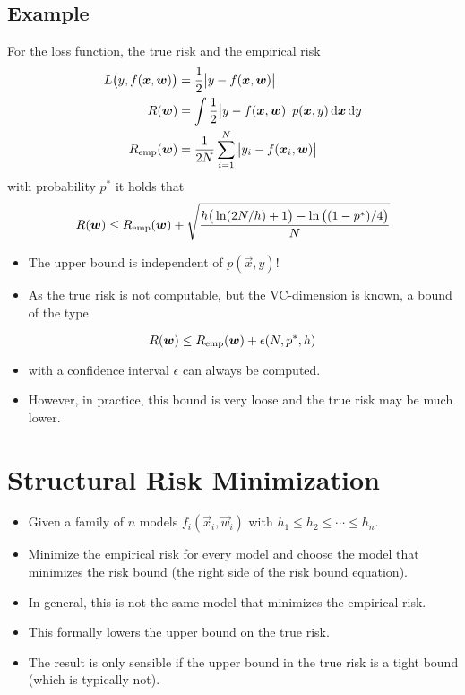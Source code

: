		\subsection{Example}
			For the loss function, the true risk and the empirical risk
			\begin{align}
				L\big(y, f(\bm{x}, \bm{w})\big) & = \frac{1}{2} \big\lvert y - f(\bm{x}, \bm{w}) \big\rvert                                           \\
				R(\bm{w})                        & = \int \frac{1}{2} \big\lvert y - f(\bm{x}, \bm{w}) \big\rvert \, p(\bm{x}, y) \dd{\bm{x}} \dd{y} \\
				R_{\operatorname{emp}}(\bm{w})                 & = \frac{1}{2N} \sum_{i = 1}^{N} \big\lvert y_i - f(\bm{x}_i, \bm{w}) \big\rvert
			\end{align}
			with probability \( p^\ast \) it holds that
			\begin{equation}
				R(\bm{w}) \leq R_{\operatorname{emp}}(\bm{w}) + \sqrt{\frac{h\big(\ln(2N / h) + 1\big) - \ln\big((1 - p^\ast) / 4\big)}{N}}
			\end{equation}
			\begin{itemize}
				\item The upper bound is independent of \( p(\vec{x}, y) \)!
				\item As the true risk is not computable, but the VC-dimension is known, a bound of the type
			\end{itemize}
			\begin{equation}
				R(\bm{w}) \leq R_{\operatorname{emp}}(\bm{w}) + \epsilon(N, p^\ast, h)
			\end{equation}
			\begin{itemize}
				\item[] with a confidence interval \(\epsilon\) can always be computed.
				\item However, in practice, this bound is very loose and the true risk may be much lower.
			\end{itemize}

	\section{Structural Risk Minimization}
		\begin{itemize}
			\item Given a family of \(n\) models \( f_i(\vec{x}_i, \vec{w}_i) \) with \( h_1 \leq h_2 \leq \cdots \leq h_n \).
			\item Minimize the empirical risk for every model and choose the model that minimizes the risk bound (the right side of the risk bound equation).
			\item In general, this is not the same model that minimizes the empirical risk.
			\item This formally lowers the upper bound on the true risk.
			\item The result is only sensible if the upper bound in the true risk is a tight bound (which is typically not).
		\end{itemize}

